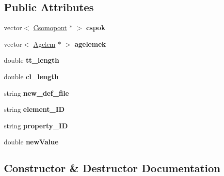 \subsection*{Public Attributes}
\begin{DoxyCompactItemize}
\item 
vector$<$ \hyperlink{class_csomopont}{Csomopont} $\ast$ $>$ {\bfseries cspok}\hypertarget{class_staci_a1b5c85269be922a1ed62890cd88e67db}{}\label{class_staci_a1b5c85269be922a1ed62890cd88e67db}

\item 
vector$<$ \hyperlink{class_agelem}{Agelem} $\ast$ $>$ {\bfseries agelemek}\hypertarget{class_staci_a6ca23dec6bf9e864efe535d836b7d02d}{}\label{class_staci_a6ca23dec6bf9e864efe535d836b7d02d}

\item 
double {\bfseries tt\+\_\+length}\hypertarget{class_staci_a23892863b8dba7d6493cbf474042f900}{}\label{class_staci_a23892863b8dba7d6493cbf474042f900}

\item 
double {\bfseries cl\+\_\+length}\hypertarget{class_staci_acaa2f299629d12a61ab95b8522ef291a}{}\label{class_staci_acaa2f299629d12a61ab95b8522ef291a}

\item 
string {\bfseries new\+\_\+def\+\_\+file}\hypertarget{class_staci_a2b3fec06ed59e026c2c34b7f82bf32e7}{}\label{class_staci_a2b3fec06ed59e026c2c34b7f82bf32e7}

\item 
string {\bfseries element\+\_\+\+ID}\hypertarget{class_staci_a257ffac68d249e9ad21b982b8ea995c5}{}\label{class_staci_a257ffac68d249e9ad21b982b8ea995c5}

\item 
string {\bfseries property\+\_\+\+ID}\hypertarget{class_staci_a9978fa86e2702420213256cd41e5de39}{}\label{class_staci_a9978fa86e2702420213256cd41e5de39}

\item 
double {\bfseries new\+Value}\hypertarget{class_staci_a52df2bacb03971d6b49f28b5d57d8db5}{}\label{class_staci_a52df2bacb03971d6b49f28b5d57d8db5}

\end{DoxyCompactItemize}


\subsection{Constructor \& Destructor Documentation}
